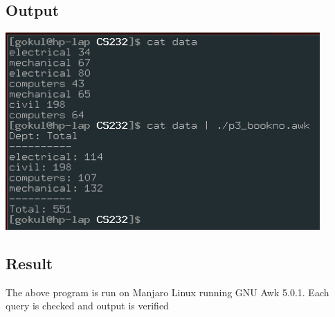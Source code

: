 \documentclass{article}
\begin{document}
\subsection{Output}
\includegraphics[width=0.9\textwidth]{img/p22.png}\newline

\subsection{Result}
The above program is run on Manjaro Linux running GNU Awk 5.0.1. 
Each query is checked and output is verified
\end{document}
